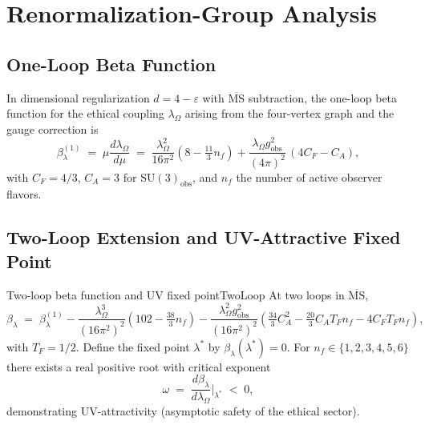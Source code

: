 \documentclass[11pt,a4paper]{article}
\theoremstyle{myrmk}
\begin{document}
\section{Renormalization-Group Analysis}
\label{sec:rg}

\subsection{One-Loop Beta Function}

In dimensional regularization $d=4-\varepsilon$ with $\overline{\mathrm{MS}}$
subtraction, the one-loop beta function for the ethical coupling $\lambda_\Omega$
arising from the four-vertex graph and the gauge correction is
\begin{equation}
  \beta_\lambda^{(1)}\;=\;\mu\frac{d\lambda_\Omega}{d\mu}
  \;=\;\frac{\lambda_\Omega^2}{16\pi^2}\!\left(8-\tfrac{11}{3}n_f\right)
  +\frac{\lambda_\Omega g^2_{\mathrm{obs}}}{(4\pi)^2}\,(4C_F-C_A),
  \label{eq:beta1}
\end{equation}
with $C_F=4/3$, $C_A=3$ for $\mathrm{SU}(3)_{\mathrm{obs}}$, and $n_f$ the number of
active observer flavors.

\subsection{Two-Loop Extension and UV-Attractive Fixed Point}

\begin{theorem}{Two-loop beta function and UV fixed point}{TwoLoop}
At two loops in $\overline{\mathrm{MS}}$,
\begin{equation}
  \beta_\lambda \;=\; \beta_\lambda^{(1)}
   - \frac{\lambda_\Omega^3}{(16\pi^2)^2}\!\left(102-\tfrac{38}{3}n_f\right)
   - \frac{\lambda_\Omega^2 g^2_{\mathrm{obs}}}{(16\pi^2)^2}
     \!\left(\tfrac{34}{3}C_A^2-\tfrac{20}{3}C_A T_F n_f - 4 C_F T_F n_f\right),
  \label{eq:beta2}
\end{equation}
with $T_F=1/2$. Define the fixed point $\lambda^*$ by $\beta_\lambda(\lambda^*)=0$.
For $n_f\in\{1,2,3,4,5,6\}$ there exists a real positive root with critical exponent
\begin{equation}
  \omega \;=\; \frac{d\beta_\lambda}{d\lambda_\Omega}\bigg|_{\lambda^*} \;<\; 0,
\end{equation}
demonstrating UV-attractivity (asymptotic safety of the ethical sector).
\end{theorem}
\end{document}
